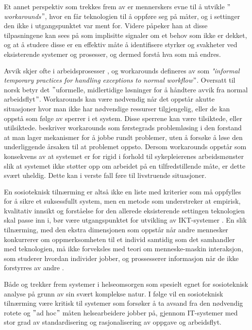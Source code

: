 \noindent
Et annet perspektiv som trekkes frem av \citet{Coiera07} er mennerskers evne til å utvikle \emph{$"$workarounds$"$}, hvor en får teknologien til å oppføre seg på måter, og i settinger den ikke i utgangspunktet var ment for. Videre påpeker han at disse tilpasningene kan sees på som  implisitte signaler om et behov som ikke er dekket, og at å studere disse er en effektiv måte å identifisere styrker og svakheter ved eksisterende systemer og prosesser, og dermed forstå hva som må endres. 

\noindent
Avvik skjer ofte i arbeidsprosesser \citep{Ackermann00}, og workarounds defineres av \citet{Kobayashi05} som \emph{"informal temporary practices for handling exceptions to normal workflow$"$}. Oversatt til norsk betyr det $"$uformelle, midlertidige løsninger for å håndtere avvik fra normal arbeidsflyt$"$.
Workarounds kan være nødvendig når det oppstår akutte situasjoner hvor man ikke har nødvendige ressurser tilgjengelig, eller de kan oppstå som følge av sperrer i et system. Disse sperrene kan være tilsiktede, eller utilsiktede. \citet{Vogelsmeier08} beskriver workarounds som førstegrads problemløsing i den forstand at man lager mekanismer for å jobbe rundt problemer, uten å forsøke å løse den underliggende årsaken til at problemet oppsto. Dersom workarounds oppstår som konsekvens av at systemet er for rigid i forhold til sykepleierenes arbeidsmønster slik at systemet ikke støtter opp om arbeidet på en tilfredstillende måte, er dette svært uheldig. Dette kan i verste fall føre til livstruende situasjoner.

\noindent
En sosioteknisk tilnærming er altså ikke en liste med kriterier som må oppfylles for å sikre et suksessfullt system, men en metode som understreker at empirisk, kvalitativ innsikt og forståelse for den allerede eksisterende settingen teknologien skal passe inn i, bør være utgangspunktet for utvikling av IKT-systemer \citep{Berg99}. En slik tilnærming, med den ekstra dimensjonen som oppstår når andre mennesker konkurrerer om oppmerksomheten til et individ samtidig som det samhandler med teknologien, må ikke forveksles med teori om menneske-maskin interaksjon, som studerer hvordan individer jobber, og prossesserer informasjon når de ikke forstyrres av andre \citep{Coiera07}.

\noindent
Både \citet{Coiera07} og \citet{Berg99} trekker frem systemer i helseomsorgen som spesielt egnet for sosioteknisk analyse på grunn av sin svært komplekse natur. I følge \citet{Berg99} vil en sosioteknisk tilnærming være kritisk til systemer som forsøker å ta avsand fra den nødvendig rotete og $"$ad hoc$"$ måten helsearbeidere jobber på, gjennom IT-systemer med stor grad av standardisering og rasjonalisering av oppgave og arbeidsflyt.






